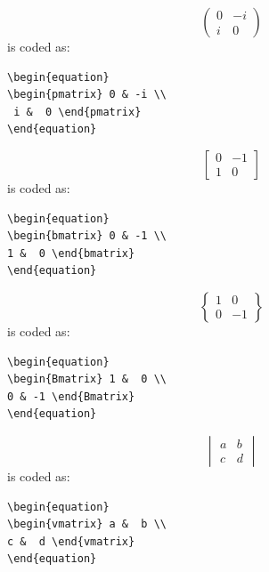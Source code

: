 \documentclass[lettersize,journal]{IEEEtran}
\begin{document}
\begin{equation}
\begin{pmatrix} 0 & -i \\
 i &  0 \end{pmatrix}
\end{equation}
is coded as:
\begin{verbatim}
\begin{equation}
\begin{pmatrix} 0 & -i \\
 i &  0 \end{pmatrix}
\end{equation}
\end{verbatim}

\begin{equation}
\begin{bmatrix} 0 & -1 \\ 
1 &  0 \end{bmatrix}
\end{equation}
is coded as:
\begin{verbatim}
\begin{equation}
\begin{bmatrix} 0 & -1 \\ 
1 &  0 \end{bmatrix}
\end{equation}
\end{verbatim}

\begin{equation}
\begin{Bmatrix} 1 &  0 \\ 
0 & -1 \end{Bmatrix}
\end{equation}
is coded as:
\begin{verbatim}
\begin{equation}
\begin{Bmatrix} 1 &  0 \\ 
0 & -1 \end{Bmatrix}
\end{equation}\end{verbatim}

\begin{equation}
\begin{vmatrix} a &  b \\ 
c &  d \end{vmatrix}
\end{equation}
is coded as:
\begin{verbatim}
\begin{equation}
\begin{vmatrix} a &  b \\ 
c &  d \end{vmatrix}
\end{equation}\end{verbatim}
\end{document}

